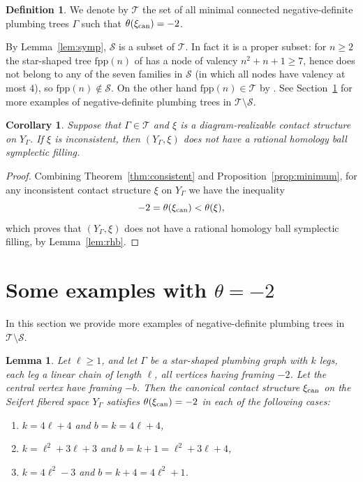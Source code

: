 \documentclass[11pt]{amsart}
\theoremstyle{plain}
\newtheorem{corollary}[theorem]{Corollary}
\newtheorem{lemma}[theorem]{Lemma}
\theoremstyle{definition}
\newtheorem{definition}[theorem]{Definition}
\theoremstyle{remark}
\begin{document}
\begin{definition}
We denote by $\mathcal{T}$ the set of all minimal connected
negative-definite plumbing trees $\Gamma$ such that
$\theta(\xi_{\rm can})=-2$.
\end{definition}

By Lemma~\ref{lem:symp}, $\mathcal{S}$ is a subset of $\mathcal{T}$.
In fact it is a proper subset: for $n\geq 2$ the star-shaped tree
$\mathrm{fpp}(n)$ of \cite[Example~5.1]{Beke25} has a node of valency
$n^2+n+1\geq 7$, hence does not belong to any of the seven families
in $\mathcal{S}$ (in which all nodes have valency at most $4$), so
$\mathrm{fpp}(n)\notin\mathcal{S}$. On the other hand
$\mathrm{fpp}(n)\in\mathcal{T}$ by \cite[Theorem~4.1]{Beke25}. See Section~\ref{sec:examples} for more examples of negative-definite plumbing trees in $\mathcal{T} \setminus \mathcal{S}$.

\begin{corollary}\label{cor:S}
Suppose that $\Gamma\in\mathcal{T}$ and $\xi$ is a diagram-realizable
contact structure on $Y_\Gamma$. If $\xi$ is inconsistent, then
$(Y_\Gamma,\xi)$ does not have a rational homology ball symplectic
filling.
\end{corollary}

\begin{proof}
Combining Theorem~\ref{thm:consistent} and
Proposition~\ref{prop:minimum}, for any inconsistent contact
structure $\xi$ on $Y_\Gamma$ we have the inequality
\[
-2=\theta(\xi_{\rm can})<\theta(\xi),
\]
which proves that $(Y_\Gamma,\xi)$ does not have a rational homology
ball symplectic filling, by Lemma~\ref{lem:rhb}.
\end{proof}


\section{Some examples with $\theta=-2$}\label{sec:examples}

In this section we provide more examples of negative-definite plumbing trees in $\mathcal{T} \setminus \mathcal{S}$.


\begin{lemma}\label{lem:theta-three-families}
Let $\ell \ge 1$, and let $\Gamma$ be a star-shaped plumbing graph with $k$ legs, each leg a linear chain of length $\ell$, all vertices having framing $-2$. Let the central vertex have framing $-b$. Then the canonical contact structure $\xi_{\rm can}$ on the Seifert fibered space $Y_\Gamma$ satisfies $\theta(\xi_{\rm can})=-2$ in each of the following cases:
\begin{enumerate}
\item[(1)] $k=4\ell+4$ and $b=k=4\ell+4$,
\item[(2)] $k=\ell^2+3\ell+3$ and $b=k+1=\ell^2+3\ell+4$,
\item[(3)] $k=4\ell^2-3$ and $b=k+4=4\ell^2+1$.
\end{enumerate}
\end{lemma}
\end{document}
